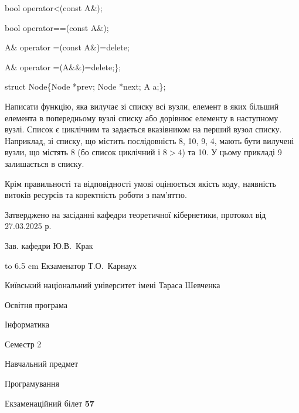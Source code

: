 \documentclass[12pt, ukrainian]{article}
\begin{document}
{\quad  bool operator<(const A\&); 

\quad  bool operator==(const A\&); 

\quad A\& operator =(const A\&)=delete; 

\quad  A\& operator =(A\&\&)=delete;\};

struct Node\{Node *prev; Node *next; A a;\};

Написати функцію, яка вилучає зі списку всі вузли, елемент в яких більший елемента в попередньому вузлі списку або дорівнює елементу в наступному вузлі. Список є циклічним та задається вказівником на перший вузол списку. Наприклад, зі списку, що містить послідовність 8, 10, 9, 4, мають бути вилучені вузли, що містять 8 (бо список циклічний і $8>4$) та 10. У цьому прикладі 9 залишається в списку.

Крім правильності та відповідності умові оцінюється якість коду, наявність витоків ресурсів та коректність роботи з пам'яттю. 

}
{\smallskip\smallskip \begin {scriptsize} Затверджено на засіданні кафедри теоретичної кібернетики, протокол   від   27.03.2025 р.\par\smallskip\smallskip\smallskip\smallskip
{\parbox {6.5 cm} {Зав. кафедри \dotfill Ю.В.~Крак}}\hspace {0.7cm} {\hbox to 6.5 cm { Екзаменатор \dotfill Т.О.~Карнаух}} \end{scriptsize}}
\newpage
{{\begin {scriptsize}\par
{ \center  Київський національний університет імені Тараса Шевченка \par}
{\parbox {5 cm}{Освітня програма \hfill}{\parbox {7 cm}{Інформатика\hfill}}\parbox {6 cm}{\hfill Семестр 2}}\par
{\parbox {5 cm} {Навчальний предмет \hfill}\parbox {7 cm}{Програмування \hfill}\parbox {6cm}{\hfill}\par}\vspace{-15pt} \end{scriptsize}}{\center Екзаменаційний білет \No \textbf { 57 }\par}}
\end{document}
